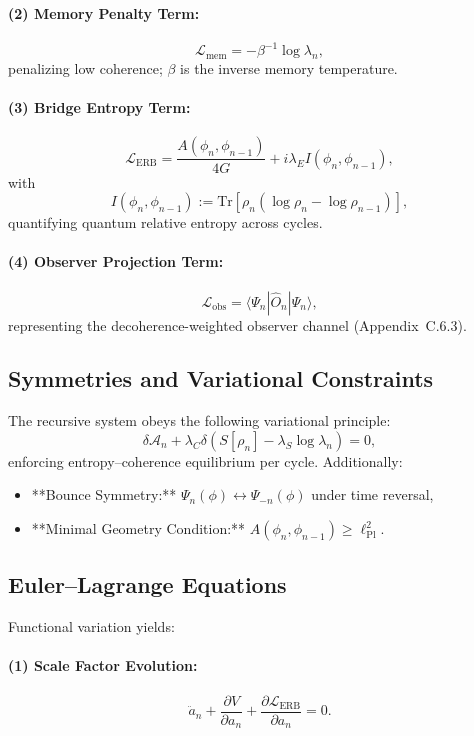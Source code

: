 \paragraph{(2) Memory Penalty Term:}
\[
\mathcal{L}_{\text{mem}} = -\beta^{-1} \log \lambda_n,
\]
penalizing low coherence; \( \beta \) is the inverse memory temperature.

\paragraph{(3) Bridge Entropy Term:}
\[
\mathcal{L}_{\text{ERB}} = \frac{A(\phi_n, \phi_{n-1})}{4G} + i \lambda_E I(\phi_n, \phi_{n-1}),
\]
with
\[
I(\phi_n, \phi_{n-1}) := \mathrm{Tr}[\rho_n (\log \rho_n - \log \rho_{n-1})],
\]
quantifying quantum relative entropy across cycles.

\paragraph{(4) Observer Projection Term:}
\[
\mathcal{L}_{\text{obs}} = \langle \Psi_n | \hat{O}_n | \Psi_n \rangle,
\]
representing the decoherence-weighted observer channel (Appendix~C.6.3).

\subsection{Symmetries and Variational Constraints}

The recursive system obeys the following variational principle:
\[
\delta \mathcal{A}_n + \lambda_C \delta \left( S[\rho_n] - \lambda_S \log \lambda_n \right) = 0,
\]
enforcing entropy–coherence equilibrium per cycle. Additionally:
\begin{itemize}
  \item **Bounce Symmetry:** \( \Psi_n(\phi) \leftrightarrow \Psi_{-n}(\phi) \) under time reversal,
  \item **Minimal Geometry Condition:** \( A(\phi_n, \phi_{n-1}) \geq \ell_{\text{Pl}}^2 \).
\end{itemize}

\subsection{Euler–Lagrange Equations}

Functional variation yields:

\paragraph{(1) Scale Factor Evolution:}
\[
\ddot{a}_n + \frac{\partial V}{\partial a_n} + \frac{\partial \mathcal{L}_{\text{ERB}}}{\partial a_n} = 0.
\]

